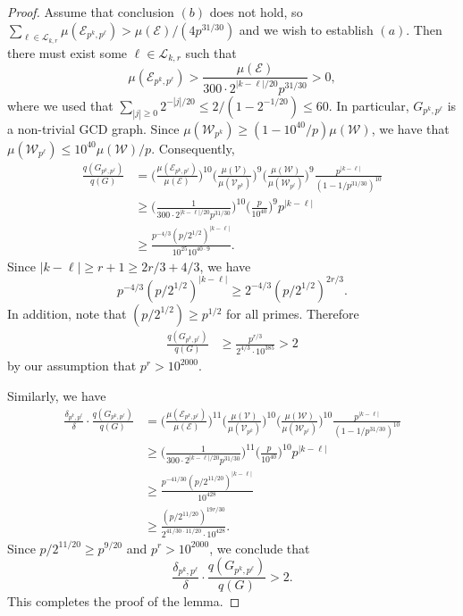 \documentclass[12pt]{amsart}
\numberwithin{equation}{section}
\theoremstyle{definition}
\theoremstyle{remark}
\newcommand{\CE}{\mathcal{E}}
\newcommand{\CL}{\mathcal{L}}
\newcommand{\CV}{\mathcal{V}}
\newcommand{\CW}{\mathcal{W}}
\renewcommand{\le}{\leqslant}
\renewcommand{\ge}{\geqslant}
\begin{document}
\begin{proof} Assume that conclusion $(b)$ does not hold, so $\sum_{\ell\in\CL_{k,r}}  \mu(\CE_{p^k,p^\ell})>\mu(\CE)/(4p^{31/30})$ and we wish to establish $(a)$. Then there must exist some $\ell\in\CL_{k,r}$ such that 
\[
\mu(\CE_{p^k,p^\ell}) > \frac{\mu(\CE)}{300\cdot2^{|k-\ell|/20}p^{31/30}} >0 ,
\]
where we used that $\sum_{|j|\ge 0}2^{-|j|/20}\le 2/(1-2^{-1/20})\le 60$. In particular, $G_{p^k,p^\ell}$ is a non-trivial GCD graph. Since $\mu(\CW_{p^k})\ge (1-10^{40}/p)\mu(\CW)$, we have that $\mu(\CW_{p^\ell})\le 10^{40}\mu(\CW)/p$. Consequently,
\begin{align*}
\frac{q(G_{p^k,p^\ell})}{q(G)}
	&= \bigg(\frac{\mu(\CE_{p^k,p^\ell})}{\mu(\CE)}\bigg)^{10}
	\bigg(\frac{\mu(\CV)}{\mu(\CV_{p^k})}\bigg)^{9}
	\bigg(\frac{\mu(\CW)}{\mu(\CW_{p^\ell})}\bigg)^{9} \frac{p^{|k-\ell|}}{(1-1/p^{31/30})^{10}} \\
	&\ge \Big(\frac{1}{300\cdot 2^{|k-\ell|/20}p^{31/30}}\Big)^{10}
	\Big(\frac{p}{10^{40}}\Big)^{9} p^{|k-\ell|} \\
	&\ge \frac{p^{-4/3}(p/2^{1/2})^{|k-\ell|}}{10^{25}10^{40\cdot 9}}.
\end{align*}
Since $|k-\ell|\ge r+1\ge 2r/3+4/3$, we have 
\[
p^{-4/3}(p/2^{1/2})^{|k-\ell|}\ge 2^{-4/3}(p/2^{1/2})^{2r/3}.
\]
In addition, note that $(p/2^{1/2})\ge p^{1/2}$ for all primes. Therefore
\begin{align*}
\frac{q(G_{p^k,p^\ell})}{q(G)}	&\ge \frac{p^{r/3}}{2^{4/3}\cdot 10^{385}}
	>2
\end{align*}
by our assumption that $p^r>10^{2000}$. 

Similarly, we have 
\begin{align*}
\frac{\delta_{p^k,p^\ell}}{\delta}\cdot \frac{q(G_{p^k,p^\ell})}{q(G)}
&= \bigg(\frac{\mu(\CE_{p^k,p^\ell})}{\mu(\CE)}\bigg)^{11}
\bigg(\frac{\mu(\CV)}{\mu(\CV_{p^k})}\bigg)^{10}
\bigg(\frac{\mu(\CW)}{\mu(\CW_{p^\ell})}\bigg)^{10} \frac{p^{|k-\ell|}}{(1-1/p^{31/30})^{10}} \\
&\ge \bigg(\frac{1}{300\cdot 2^{|k-\ell|/20}p^{31/30}}\bigg)^{11}
\bigg(\frac{p}{10^{40}}\bigg)^{10} p^{|k-\ell|} \\
&\ge \frac{p^{-41/30}(p/2^{11/20})^{|k-\ell|}}{10^{428}}\\
&\ge\frac{(p/2^{11/20})^{19r/30}}{2^{41/30\cdot 11/20}\cdot 10^{428}}.
\end{align*}
Since $p/2^{11/20}\ge p^{9/20}$ and $p^r>10^{2000}$, we conclude that 
\[
\frac{\delta_{p^k,p^\ell}}{\delta}\cdot \frac{q(G_{p^k,p^\ell})}{q(G)}>2.
\]
This completes the proof of the lemma.
\end{proof}
\end{document}
